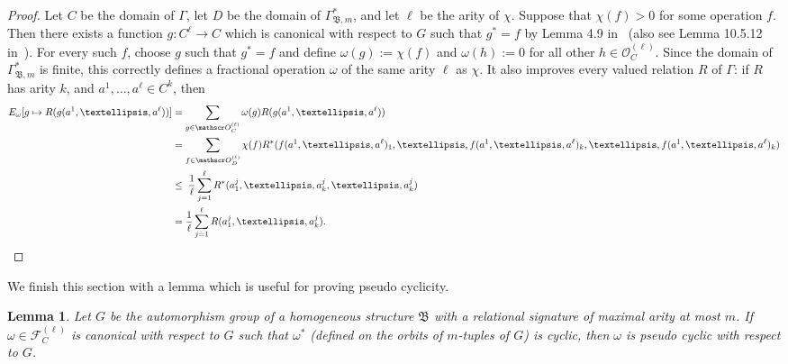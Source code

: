 \documentclass[nonacm]{acmart}
\newcommand{\bB}{{\mathfrak B}}
\newtheorem{lemma}[theorem]{Lemma}
\begin{document}
\begin{proof}
Let $C$ be the domain of $\Gamma$, let $D$ be the domain of $\Gamma^*_{\bB,m}$, and let $\ell$ be the arity of $\chi$.
Suppose that 
$\chi(f) > 0$ for some operation $f$. 
Then there exists a function $g \colon C^{\ell}\to C$ which is canonical with respect to $G$ such that $g^* = f$ by Lemma 4.9 in~\cite{BodMot-Unary} (also see Lemma 10.5.12 in~\cite{Book}). 
For every such $f$, choose $g$ such that $g^*=f$ and  define $\omega(g) := \chi(f)$ 
and $\omega(h) := 0$ for all other $h \in {\mathscr O}_C^{(\ell)}$. Since the domain of $\Gamma^*_{\bB,m}$ is finite, this correctly defines a fractional operation $\omega$ of the same arity $\ell$ as $\chi$. It also improves every valued relation $R$ of $\Gamma$: if $R$ has arity $k$, and $a^1,\dots,a^{\ell} \in C^k$, then 
\begin{align*}
    E_\omega[g \mapsto R(g(a^1,\dots,a^{\ell}))] 
    &= \sum_{g \in {\mathscr O}_C^{(\ell)}} \omega(g) R(g(a^1,\dots,a^{\ell})) \\
    &= \sum_{f \in {\mathscr O}^{(\ell)}_D}  \chi(f) R^*(f(a^1,\dots,a^{\ell})_1,\dots,f(a^1,\dots,a^{\ell})_k,\dots,f(a^1,\dots,a^{\ell})_k) \\
       & \leq  \; \frac{1}{\ell} \sum_{j = 1}^{\ell} R^*(a^j_1,\dots,a^j_k,\dots,a^j_k) \\
    &=  \frac{1}{\ell} \sum_{j = 1}^{\ell} R(a^j_1,\dots,a^j_k).  
    \qedhere
\end{align*}
\end{proof}

We finish this section with a lemma which is useful for proving pseudo cyclicity.

\begin{lemma}\label{lem:pc}
Let $G$ be the automorphism group 
of a homogeneous structure $\bB$ with a relational signature of maximal arity at most $m$.
    If $\omega \in {\mathscr F}_C^{(\ell)}$ 
is canonical with respect to $G$ such that $\omega^*$ (defined on the orbits of $m$-tuples of $G$) is cyclic, then $\omega$ is pseudo cyclic with respect to $G$. 
\end{lemma}
\end{document}
